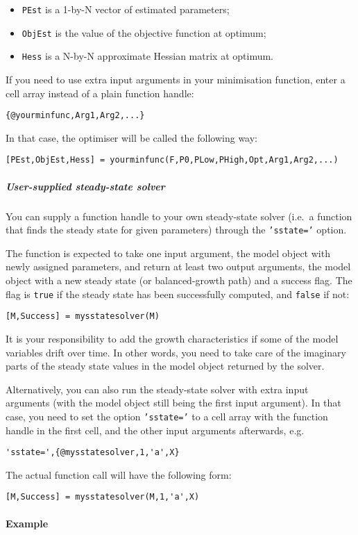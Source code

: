\begin{itemize}
\itemsep1pt\parskip0pt
\item
  \texttt{PEst} is a 1-by-N vector of estimated parameters;
\item
  \texttt{ObjEst} is the value of the objective function at optimum;
\item
  \texttt{Hess} is a N-by-N approximate Hessian matrix at optimum.
\end{itemize}

If you need to use extra input arguments in your minimisation function,
enter a cell array instead of a plain function handle:

\begin{verbatim}
{@yourminfunc,Arg1,Arg2,...}
\end{verbatim}

In that case, the optimiser will be called the following way:

\begin{verbatim}
[PEst,ObjEst,Hess] = yourminfunc(F,P0,PLow,PHigh,Opt,Arg1,Arg2,...)
\end{verbatim}

\subparagraph{User-supplied steady-state
solver}

You can supply a function handle to your own steady-state solver (i.e.~a
function that finds the steady state for given parameters) through the
\texttt{'sstate='} option.

The function is expected to take one input argument, the model object
with newly assigned parameters, and return at least two output
arguments, the model object with a new steady state (or balanced-growth
path) and a success flag. The flag is \texttt{true} if the steady state
has been successfully computed, and \texttt{false} if not:

\begin{verbatim}
[M,Success] = mysstatesolver(M)
\end{verbatim}

It is your responsibility to add the growth characteristics if some of
the model variables drift over time. In other words, you need to take
care of the imaginary parts of the steady state values in the model
object returned by the solver.

Alternatively, you can also run the steady-state solver with extra input
arguments (with the model object still being the first input argument).
In that case, you need to set the option \texttt{'sstate='} to a cell
array with the function handle in the first cell, and the other input
arguments afterwards, e.g.

\begin{verbatim}
'sstate=',{@mysstatesolver,1,'a',X}
\end{verbatim}

The actual function call will have the following form:

\begin{verbatim}
[M,Success] = mysstatesolver(M,1,'a',X)
\end{verbatim}

\paragraph{Example}


